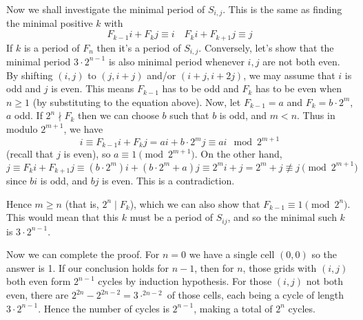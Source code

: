 \documentclass[11pt]{article}
\newcommand{\<}{\langle}
\renewcommand{\>}{\rangle}
\begin{document}
\begin{enumerate}
	Now we shall investigate the minimal period of $S_{i, j}$. 
	This is the same as finding the minimal positive $k$ with 
	\[
	F_{k-1}i+F_kj\equiv i\quad F_ki + F_{k+1}j\equiv j
	\]
	If $k$ is a period of ${F_n}$ then it's a period of $S_{i, j}$. Conversely, let's show that the minimal period $3\cdot 2^{n-1}$ is also minimal period whenever $i, j$ are not both even. By shifting $(i, j)$ to $(j, i+j)$ and/or $(i+j, i+2j)$, we may assume that $i$ is odd and $j$ is even. 
	This means $F_{k-1}$ has to be odd and $F_k$ has to be even when $n\ge 1$ (by substituting to the equation above). 
	Now, let $F_{k-1}=a$ and $F_k=b\cdot 2^m$, $a$ odd. 
	If $2^n\nmid F_k$ then we can choose $b$ such that $b$ is odd, and $m<n$. 
	Thus in modulo $2^{m+1}$, we have 
	\[
	i\equiv F_{k-1}i+F_kj=ai + b\cdot 2^m j\equiv ai\mod{2^{m+1}}
	\]
	(recall that $j$ is even), so $a\equiv 1\pmod{2^{m+1}}$. 
	On the other hand, 
	\[
	j\equiv F_ki + F_{k+1}j\equiv (b\cdot 2^m) i + (b\cdot 2^m+a)j
	\equiv 2^m i + j = 2^m+j\not\equiv j\pmod{2^{m+1}}
	\]
	since $bi$ is odd, and $bj$ is even. This is a contradiction. 
	
	Hence $m\ge n$ (that is, $2^n\mid F_k$), which we can also show that $F_{k-1}\equiv 1\pmod{2^n}$. 
	This would mean that this $k$ must be a period of $S_{ij}$, and so the minimal such $k$ is $3\cdot 2^{n-1}$. 
	
	Now we can complete the proof. For $n=0$ we have a single cell $(0, 0)$ so the answer is 1. 
	If our conclusion holds for $n-1$, then for $n$, those grids with $(i, j)$ both even form $2^{n-1}$ cycles by induction hypothesis. For those $(i, j)$ not both even, there are $2^{2n}-2^{2n-2}=3\cdot^{2n-2}$ of those cells, each being a cycle of length $3\cdot 2^{n-1}$. Hence the number of cycles is $2^{n-1}$, making a total of $2^n$ cycles. 
	
\end{enumerate}
	
	
\end{document}
